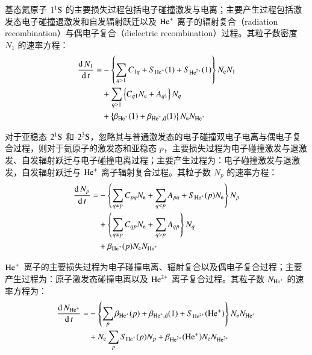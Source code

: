 基态氦原子 $1^1{\rm S}$ 的主要损失过程包括电子碰撞激发与电离；主要产生过程包括激发态电子碰撞退激发和自发辐射跃迁以及 ${\rm He}^+$ 离子的辐射复合（radiation recombination）与偶电子复合（dielectric recombination）过程。其粒子数密度 $N_1$ 的速率方程：
\begin{equation}
    \label{eq:crm:gs}
    \begin{aligned}
        \frac{{\rm d}\,N_1}{{\rm d}\,t}=
        &-\left\{\sum_{q>1}C_{1q}+S_{{\rm He}^+}(1)+S_{{\rm He}^{2+}}(1)\right\}N_{\rm e}N_1\\
        &+\sum_{q>1}\left\{C_{q1}N_{\rm e}+A_{q1}\right\}N_q\\
        &+\left\{\beta_{{\rm He}^+}(1)+\beta_{{\rm He}^+,\rm d}(1)\right\}N_{\rm e}N_{{\rm He}^+}
    \end{aligned}
\end{equation}

对于亚稳态 $2^1{\rm S}$ 和 $2^3{\rm S}$，忽略其与普通激发态的电子碰撞双电子电离与偶电子复合过程，则对于氦原子的激发态和亚稳态 $p$，主要损失过程为电子碰撞激发与退激发、自发辐射跃迁与电子碰撞电离过程；主要产生过程为：电子碰撞激发与退激发，自发辐射跃迁与 ${\rm He}^+$ 离子辐射复合过程。其粒子数 $N_p$ 的速率方程：
\begin{equation}
\label{eq:crm:excstate}
\begin{aligned}
\frac{{\rm d}\,N_p}{{\rm d}\,t}=
&-\left\{\sum_{q\ne p}C_{pq}N_{\rm e}+\sum_{q<p}A_{pq}+S_{{\rm He}^+}(p)N_{\rm e}\right\}N_p\\
&+\left\{\sum_{q\ne p}C_{qp}N_{\rm e}+\sum_{q>p}A_{qp}\right\}N_q\\
&+\beta_{{\rm He}^+}(p)N_{\rm e}N_{{\rm He}^+}
\end{aligned}
\end{equation}

${\rm He}^+$~离子的主要损失过程为电子碰撞电离、辐射复合以及偶电子复合过程；主要产生过程为：原子激发态碰撞电离以及 ${\rm He}^{2+}$ 离子复合过程。其粒子数 $N_{{\rm He}^+}$ 的速率方程为：
\begin{equation}
\label{eq:crm:HeII}
\begin{aligned}
\frac{{\rm d}\,N_{{\rm He}^+}}{{\rm d}\,t}=
&-\left\{\sum_{p}\beta_{{\rm He}^+}(p)+\beta_{{\rm He}^+,{\rm d}}(1)+S_{{\rm He}^{2+}}({\rm He}^+)\right\}N_{\rm e}N_{{\rm He}^+}\\
&+N_{\rm e}\sum_{p}S_{{\rm He}^+}(p)N_p+\beta_{{\rm He}^{2+}}({\rm He}^{+})N_{\rm e}N_{{\rm He}^{2+}}
\end{aligned}
\end{equation}

